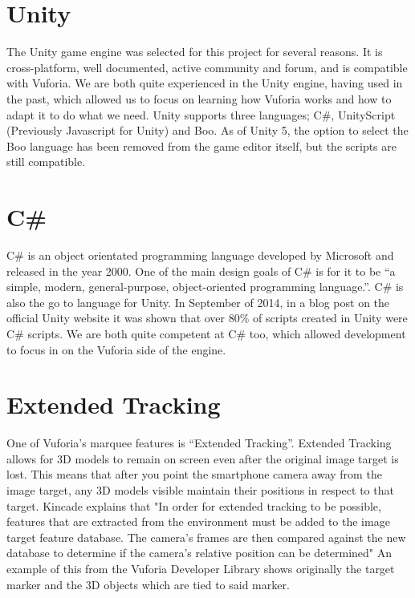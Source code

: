\section{Unity}
The Unity game engine was selected for this project for several reasons. It is cross-platform, well documented, active community and forum, and is compatible with Vuforia. We are both quite experienced in the Unity engine, having used in the past, which allowed us to focus on learning how Vuforia works and how to adapt it to do what we need. Unity supports three languages; C\#, UnityScript (Previously Javascript for Unity) and Boo. As of Unity 5, the option to select the Boo language has been removed from the game editor itself, but the scripts are still compatible. 

\section{C\#}
C\# is an object orientated programming language developed by Microsoft and released in the year 2000. One of the main design goals of C\# is for it to be “a simple, modern, general-purpose, object-oriented programming language.”\cite{emca}. C\# is also the go to language for Unity. In September of 2014, in a blog post on the official Unity website\cite{unityLanguage} it was shown that over 80\% of scripts created in Unity were C\# scripts. We are both quite competent at C\# too, which allowed development to focus in on the Vuforia side of the engine.

\section{Extended Tracking}
One of Vuforia’s marquee features is “Extended Tracking”. Extended Tracking allows for 3D models to remain on screen even after the original image target is lost. This means that after you point the smartphone camera away from the image target, any 3D models visible maintain their positions in respect to that target. Kincade explains that "In order for extended tracking to be possible, features that are extracted from the environment must be added to the image target feature database. The camera’s frames are then compared against the new database to determine if the camera’s relative position can be determined"\cite{kincade}
An example of this from the Vuforia Developer Library\cite{vuforiaExtended} shows originally the target marker and the 3D objects which are tied to said marker.

